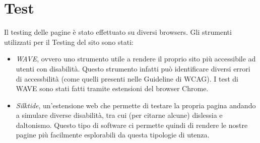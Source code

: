 \section{Test}
	Il testing delle pagine è stato effettuato su diversi browsers.
  Gli strumenti utilizzati per il Testing del sito sono stati:
  \begin{itemize}
    \item \textit{WAVE}, ovvero uno strumento utile a rendere il proprio sito più accessibile ad utenti con disabilità. Questo strumento infatti può identificare diversi errori di accessbilità (come quelli presenti nelle Guideline di WCAG). I test di WAVE sono stati fatti tramite estensioni del browser Chrome.
    \item \textit{Silktide}, un'estensione web che permette di testare la propria pagina andando a simulare diverse disabilità, tra cui (per citarne alcune) dislessia e daltonismo. Questo tipo di software ci permette quindi di rendere le nostre pagine più facilmente esplorabili da questa tipologie di utenza.
  \end{itemize}
